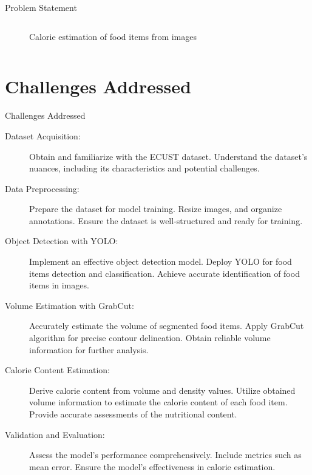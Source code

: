 \documentclass{beamer}
\begin{document}
\begin{frame}{Problem Statement}
\begin{columns}
\begin{figure}
				\caption{Calorie estimation of food items from images\cite{liang}}
			\end{figure}
		\end{columns}
	\end{frame}
	
	\section{Challenges Addressed}
	\begin{frame}{Challenges Addressed}\footnotesize
		\begin{block}{}
			\begin{description}
				\item[Dataset Acquisition:] Obtain and familiarize with the ECUST dataset. Understand the dataset's nuances, including its characteristics and potential challenges.
				\item[Data Preprocessing:] Prepare the dataset for model training. Resize images, and organize annotations. Ensure the dataset is well-structured and ready for training.\pause
				\item[Object Detection with YOLO:] Implement an effective object detection model. Deploy YOLO for food items detection and classification. Achieve accurate identification of food items in images.
				\item[Volume Estimation with GrabCut:] Accurately estimate the volume of segmented food items. Apply GrabCut algorithm for precise contour delineation. Obtain reliable volume information for further analysis.\pause
				\item[Calorie Content Estimation:]  Derive calorie content from volume and density values. Utilize obtained volume information to estimate the calorie content of each food item. Provide accurate assessments of the nutritional content.
				\item[Validation and Evaluation:] Assess the model's performance comprehensively. Include metrics such as mean error. Ensure the model's effectiveness in calorie estimation.			
			\end{description}
		\end{block}
	\end{frame}
	
\end{document}
